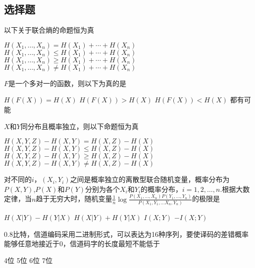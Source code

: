\documentclass{exam}
\newif\ifprint
\newcommand{\blank}[2][1cm]{\uline{\makebox[#1][c]{%
  \ifprint
    \phantom{#2}%
  \else
    #2%
  \fi}}}
\begin{document}
\begin{CJK*}{UTF8}{gbsn}
\section*{选择题}
    \begin{questions}
    \question 以下关于联合熵的命题\blank{}恒为真
    \begin{choices}
        \choice $H({X_1}, \ldots ,{X_n}) = H({X_1}) +  \cdots  + H({X_n})$
        \choice $H({X_1}, \ldots ,{X_n}) \le H({X_1}) +  \cdots  + H({X_n})$
        \choice $H({X_1}, \ldots ,{X_n}) \ge H({X_1}) +  \cdots  + H({X_n})$
        \choice $H({X_1}, \ldots ,{X_n}) \ne H({X_1}) +  \cdots  + H({X_n})$\\
    \end{choices}
    
    \question $F$是一个多对一的函数，则以下为真的是\blank{}
    \begin{choices}
        \choice $H(F(X)) = H(X)$
        \choice $H(F(X)) > H(X)$
        \choice $H(F(X)) < H(X)$
        \choice 都有可能\\
    \end{choices}
    
    \question $X$和$Y$同分布且概率独立，则以下命题\blank{}恒为真
    \begin{choices}
        \choice $H(X,Y,Z) - H(X,Y) = H(X,Z) - H(X)$
        \choice $H(X,Y,Z) - H(X,Y) \le H(X,Z) - H(X)$
        \choice $H(X,Y,Z) - H(X,Y) \ge H(X,Z) - H(X)$
        \choice $H(X,Y,Z) - H(X,Y) \ne H(X,Z) - H(X)$\\
    \end{choices}
    
    \question 对不同的$i$，$\left( {{X_i},{Y_i}} \right)$之间是概率独立的离散型联合随机变量，概率分布为$P(X,Y)$,$P(X)$和$P(Y)$分别为各个$X_i$和$Y_i$的概率分布，$i = 1,2, \ldots ,n$.根据大数定律，当$n$趋于无穷大时，随机变量$\frac{1}{n}\log \frac{{P\left( {{X_1}, \ldots ,{X_n}} \right)P\left( {{Y_1}, \ldots ,{Y_n}} \right)}}{{P({X_1},{Y_1}, \ldots {X_n},{Y_n})}}$的极限是\blank{}
    \begin{choices}
        \choice $H(X|Y) - H(Y|X)$
        \choice $H(X|Y) + H(Y|X)$
        \choice $I(X;Y)$
        \choice $-I(X;Y)$\\
    \end{choices}
    
    0.8比特，信道编码采用二进制形式，可以表达为16种序列，要使译码的差错概率能够任意地接近于0，信道码字的长度最短不能低于\blank{}
    \begin{choices}
        \choice 4位
        \choice 5位
        \choice 6位
        \choice 7位
    \end{choices}
\end{questions}


\end{CJK*}
\end{document}
